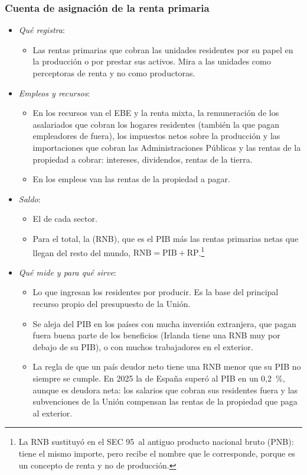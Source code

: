 \documentclass[11pt]{article}
\begin{document}
\subsubsection{Cuenta de asignación de la renta primaria}\label{sec:asignacion}

\begin{itemize}
\item \emph{Qué registra}:
  \begin{itemize}
  \item Las rentas primarias que cobran las unidades residentes por su papel en la producción o por prestar sus activos. Mira a las unidades como perceptoras de renta y no como productoras.
  \end{itemize}
\item \emph{Empleos y recursos}:
  \begin{itemize}
  \item En los recursos van el EBE y la renta mixta, la remuneración de los asalariados que cobran los hogares residentes (también la que pagan empleadores de fuera), los impuestos netos sobre la producción y las importaciones que cobran las Administraciones Públicas y las rentas de la propiedad a cobrar: intereses, dividendos, rentas de la tierra.
  \item En los empleos van las rentas de la propiedad a pagar.
  \end{itemize}
\item \emph{Saldo}:
  \begin{itemize}
  \item El  de cada sector.
  \item Para el total, la  (RNB), que es el PIB más las rentas primarias netas que llegan del resto del mundo, $\mathrm{RNB}=\mathrm{PIB}+\mathrm{RP}$.\footnote{La RNB sustituyó en el SEC 95~al antiguo producto nacional bruto (PNB): tiene el mismo importe, pero recibe el nombre que le corresponde, porque es un concepto de renta y no de producción.}
  \end{itemize}
\item \emph{Qué mide y para qué sirve}:
  \begin{itemize}
  \item Lo que ingresan los residentes por producir. Es la base del principal recurso propio del presupuesto de la Unión.
  \item Se aleja del PIB en los países con mucha inversión extranjera, que pagan fuera buena parte de los beneficios (Irlanda tiene una RNB muy por debajo de su PIB), o con muchos trabajadores en el exterior.
  \item La regla de que un país deudor neto tiene una RNB menor que su PIB no siempre se cumple. En 2025 la de España superó al PIB en un 0,2~\%, aunque es deudora neta: los salarios que cobran sus residentes fuera y las subvenciones de la Unión compensan las rentas de la propiedad que paga al exterior\nocite{INE2026CNA2025,Eurostat2026nasa10nftr}.
  \end{itemize}
\end{itemize}
\end{document}
